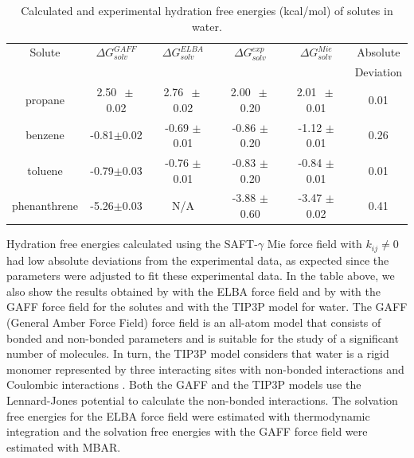 \begin{table}[H]
	\centering
	\caption{Calculated and experimental hydration free energies  (kcal/mol) of solutes in water.}
	\label{tbl:solv2}
	\begin{tabular}{cccccc}
		\hline\hline
		Solute       & $\Delta G_{solv}^{GAFF}$ & $\Delta G_{solv}^{ELBA}$ & $\Delta G_{solv}^{exp}$ & $\Delta G_{solv}^{Mie}$ & Absolute  \\
		&                          &                          &                         &                         & Deviation \\ \hline\hline
		propane      & 2.50 $\, \pm$0.02           & 2.76 $\, \pm$ 0.02          & 2.00 $\, \pm$ 0.20         & 2.01 $ \, \pm$ 0.01         & 0.01      \\
		benzene      & -0.81$\pm$0.02           & -0.69 $\pm$ 0.01         & -0.86 $\pm$ 0.20        & -1.12 $\pm$ 0.01        & 0.26      \\
		toluene      & -0.79$\pm$0.03           & -0.76 $\pm$ 0.01         & -0.83 $\pm$ 0.20        & -0.84 $\pm$ 0.01        & 0.01      \\
		phenanthrene & -5.26$\pm$0.03           & N/A                        & -3.88 $\pm$ 0.60        & -3.47 $\pm$ 0.02        & 0.41      \\ \hline\hline
	\end{tabular}
	
\end{table}

Hydration free energies calculated using the SAFT-$\gamma$ Mie force field with $k_{ij} \neq 0$ had low absolute deviations from the experimental data, as expected since the parameters were adjusted to fit these experimental data. In the table above, we also show the results obtained by  with the ELBA force field and by  with the GAFF force field for the solutes and with the TIP3P model for water. The GAFF (General Amber Force Field) force field is an all-atom model that consists of bonded and non-bonded parameters and is suitable for the study of a significant number of molecules. In turn, the TIP3P model considers that water is a rigid monomer represented by three interacting sites with non-bonded interactions and Coulombic interactions \cite{doi:10.1063/1.445869}. Both the GAFF and the TIP3P models use the Lennard-Jones potential to calculate the non-bonded interactions. The solvation free energies for the ELBA force field were estimated with thermodynamic integration and the solvation free energies with the GAFF force field were estimated with MBAR.

